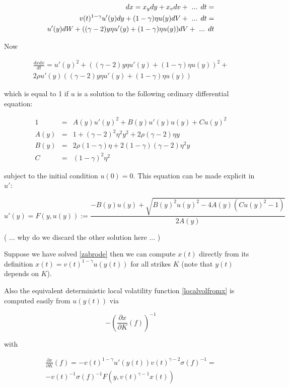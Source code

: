 \documentclass{amsart}
\theoremstyle{plain}
\numberwithin{equation}{section}
\begin{document}
\begin{eqnarray}
dx = x_y dy + x_v dv + \textnormal{ ... } dt = \\
v(t)^{1-\gamma} u'(y) dy + (1-\gamma) \eta u(y) dV + \textnormal{ ... } dt = \\
u'(y) dW + ((\gamma-2)y \eta u'(y)+(1-\gamma)\eta u(y)) dV + \textnormal{ ... } dt
\end{eqnarray}

Now

\begin{eqnarray}
\frac{dx dx}{dt} = u'(y)^2 + ((\gamma-2)y \eta u'(y)+(1-\gamma)\eta u(y))^2 + \\
2 \rho u'(y) ((\gamma-2)y \eta u'(y)+(1-\gamma)\eta u(y))
\end{eqnarray}

which is equal to 1 if $u$ is a solution to the following ordinary differential equation:

\begin{eqnarray}
1 &=& A(y) u'(y)^2 + B(y) u'(y)u(y) + C u(y)^2 \\
A(y) &=& 1+(\gamma -2)^2 \eta^2 y^2 + 2\rho(\gamma-2)\eta y \\
B(y) &=& 2\rho(1-\gamma)\eta + 2(1-\gamma)(\gamma-2)\eta^2 y \\
C &=& (1-\gamma)^2\eta^2
\end{eqnarray}

subject to the initial condition $u(0)=0$. This equation can be made explicit in $u'$:

\begin{equation}\label{zabrode}
u'(y) = F(y,u(y)) := \frac{-B(y)u(y)+\sqrt{B(y)^2u(y)^2-4A(y)(Cu(y)^2-1)}}{2A(y)}
\end{equation}

( ... why do we discard the other solution here ... )

Suppose we have solved \ref{zabrode} then we can compute $x(t)$ directly from its
definition $x(t) = v(t)^{1-\gamma}u(y(t))$ for all strikes $K$ (note that $y(t)$ depends on $K$).

Also the equivalent deterministic local volatility function \ref{localvolfromx} is computed
easily  from $u(y(t))$ via

\begin{equation}
-\left(\frac{\partial x}{\partial K}(f)\right)^{-1}
\end{equation}

with

\begin{eqnarray}
\frac{\partial x}{\partial K}(f) = - v(t)^{1-\gamma} u'(y(t)) v(t)^{\gamma -2} \sigma(f)^{-1}
= \\ -v(t)^{-1}\sigma(f)^{-1} F(y,v(t)^{\gamma-1}x(t))
\end{eqnarray}
\end{document}
